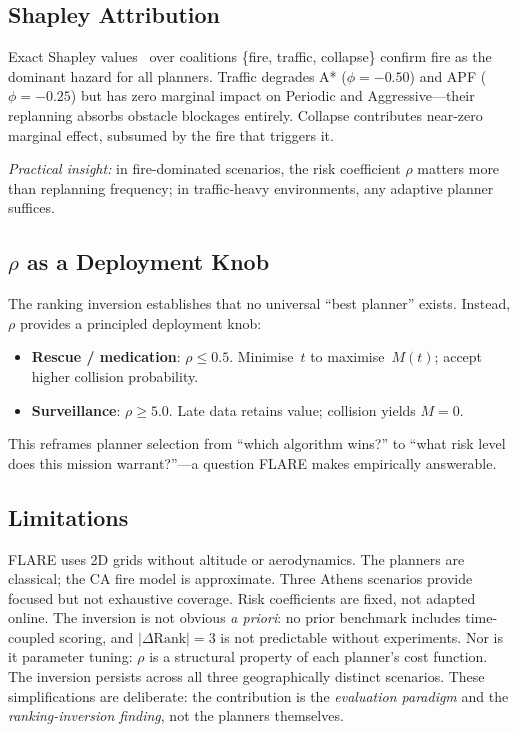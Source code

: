 \documentclass[conference]{IEEEtran}
\begin{document}
\subsection{Shapley Attribution}

Exact Shapley values~\cite{Shapley1953} over coalitions \{fire, traffic,
collapse\} confirm fire as the dominant hazard for all planners. Traffic
degrades A* ($\phi{=}-0.50$) and APF ($\phi{=}-0.25$) but has zero
marginal impact on Periodic and Aggressive---their replanning absorbs
obstacle blockages entirely. Collapse contributes near-zero marginal effect,
subsumed by the fire that triggers it.

\emph{Practical insight:} in fire-dominated scenarios, the risk coefficient
$\rho$ matters more than replanning frequency; in traffic-heavy
environments, any adaptive planner suffices.

\subsection{$\rho$ as a Deployment Knob}

The ranking inversion establishes that no universal ``best planner''
exists. Instead, $\rho$ provides a principled deployment knob:

\begin{itemize}
  \item \textbf{Rescue / medication}: $\rho \leq 0.5$. Minimise~$t$ to
    maximise~$M(t)$; accept higher collision probability.
  \item \textbf{Surveillance}: $\rho \geq 5.0$. Late data retains value;
    collision yields $M{=}0$.
\end{itemize}
This reframes planner selection from ``which algorithm wins?'' to ``what
risk level does this mission warrant?''---a question FLARE makes
empirically answerable.

\subsection{Limitations}

FLARE uses 2D grids without altitude or aerodynamics. The planners are
classical; the CA fire model is approximate. Three Athens scenarios provide
focused but not exhaustive coverage. Risk coefficients are fixed, not
adapted online. The inversion is not obvious \emph{a priori}: no prior benchmark includes
time-coupled scoring, and $|\Delta\text{Rank}|{=}3$ is not predictable
without experiments. Nor is it parameter tuning: $\rho$ is a structural
property of each planner's cost function. The inversion persists across all
three geographically distinct scenarios. These simplifications are deliberate:
the contribution is the \emph{evaluation paradigm} and the
\emph{ranking-inversion finding}, not the planners themselves.
\end{document}
